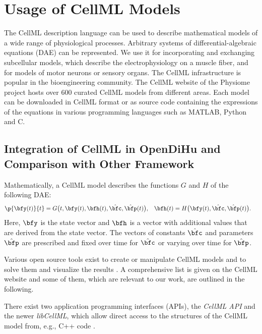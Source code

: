 
\section{Usage of CellML Models}\label{sec:usage_cellml}

The CellML description language can be used to describe mathematical models of a wide range of physiological processes. Arbitrary systems of differential-algebraic equations (DAE) can be represented.
We use it for incorporating and exchanging subcellular models, which describe the electrophysiology on a muscle fiber, and for models of motor neurons or sensory organs.
The CellML infrastructure is popular in the bioengineering community. The CellML website of the Physiome project hosts over 600 curated CellML models from different areas. Each model can be downloaded in CellML format or as source code containing the expressions of the equations in various programming languages such as MATLAB, Python and C.

\subsection{Integration of CellML in OpenDiHu and Comparison with Other Framework}

Mathematically, a CellML model describes the functions $G$ and $H$ of the following DAE:
\begin{align}\label{eq:cellml_generic_dae}
  \p{\bfy(t)}{t} &= G\big(t,\bfy(t),\bfh(t),\hat{\bfc},\hat{\bfp}(t)\big), & \bfh(t) &= H\big(\bfy(t),\hat{\bfc},\hat{\bfp}(t)\big).
\end{align}
Here, $\bfy$ is the state vector and $\bfh$ is a vector with additional values that are derived from the state vector. The vectors of constants $\hat{\bfc}$ and parameters $\hat{\bfp}$ are prescribed and fixed over time for $\hat{\bfc}$ or varying over time for $\hat{\bfp}$.

Various open source tools exist to create or manipulate CellML models and to solve them and visualize the results \cite{pmid18579471}. A comprehensive list is given on the CellML website \cite{cellmlWebsite} and some of them, which are relevant to our work, are outlined in the following.

There exist two application programming interfaces (APIs), the \emph{CellML API} and the newer \emph{libCellML}, which allow direct access to the structures of the CellML model from, e.g., C++ code \cite{pmid20377909}. 

